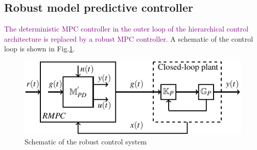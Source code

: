 \documentclass[letterpaper, 10 pt, conference]{ieeeconf}  %
\begin{document}
	\subsection{Robust model predictive controller}
	\textcolor{purple}{The deterministic MPC controller in the outer loop of the hierarchical control architecture is replaced by a robust MPC controller.} A schematic of the control loop is shown in Fig.\ref{fullloop}. 
	\begin{figure}[h]
		\vspace{-3pt}
		\hspace{20pt}
		\includegraphics[scale = 0.9]{final_robust.pdf}
		\caption{Schematic of the robust control system}
		\label{fullloop}
	\end{figure} 
	
\end{document}
